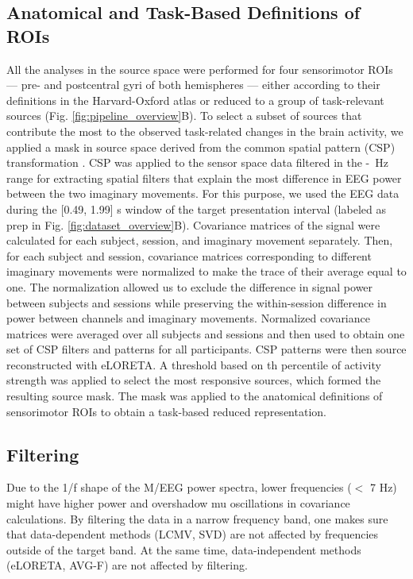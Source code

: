 \subsection{Anatomical and Task-Based Definitions of ROIs}

All the analyses in the source space were performed for four sensorimotor ROIs --- pre- and postcentral gyri of both hemispheres --- either according to their definitions in the Harvard-Oxford atlas \citep{Frazier2005HOA, Desikan2006HOA, Makris2006HOA, Goldstein2007HOA, Jenkinson2012FSL} or reduced to a group of task-relevant sources (Fig. \ref{fig:pipeline_overview}B). To select a subset of sources that contribute the most to the observed task-related changes in the brain activity, we applied a mask in source space derived from the common spatial pattern (CSP) transformation \citep{Koles1990, Ramoser2000}. CSP was applied to the sensor space data filtered in the \muLow-\muHigh~Hz range for extracting spatial filters that explain the most difference in EEG power between the two imaginary movements. For this purpose, we used the EEG data during the [0.49, 1.99] s window of the target presentation interval (labeled as prep in Fig. \ref{fig:dataset_overview}B). Covariance matrices of the signal were calculated for each subject, session, and imaginary movement separately. Then, for each subject and session, covariance matrices corresponding to different imaginary movements were normalized to make the trace of their average equal to one. The normalization allowed us to exclude the difference in signal power between subjects and sessions while preserving the within-session difference in power between channels and imaginary movements. Normalized covariance matrices were averaged over all subjects and sessions and then used to obtain one set of CSP filters and patterns for all participants. CSP patterns were then source reconstructed with eLORETA. A threshold based on \cspSourceThreshold th percentile of activity strength was applied to select the most responsive sources, which formed the resulting source mask. The mask was applied to the anatomical definitions of sensorimotor ROIs to obtain a task-based reduced representation.

\subsection{Filtering}

Due to the 1/f shape of the M/EEG power spectra, lower frequencies ($<$ 7 Hz) might have higher power and overshadow mu oscillations in covariance calculations. By filtering the data in a narrow frequency band, one makes sure that data-dependent methods (LCMV, SVD) are not affected by frequencies outside of the target band. At the same time, data-independent methods (eLORETA, AVG-F) are not affected by filtering.

